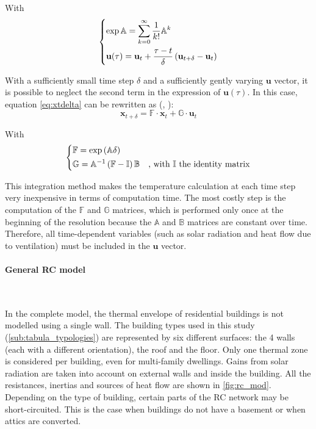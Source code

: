 \documentclass[11pt]{article}
\begin{document}
        \noindent
        With
        $$
        \begin{dcases}
          \exp \mathbb{A}= \sum_{k=0}^\infty \frac{1}{k!}\mathbb{A}^k\\
          \mathbf{u}(\tau)= \mathbf{u}_t + \frac{\tau-t}{\delta}\left(\mathbf{u}_{t+\delta}-\mathbf{u}_t\right)\\
        \end{dcases}
        $$

        With a sufficiently small time step $\delta$ and a sufficiently gently varying $\mathbf{u}$ vector, it is possible to neglect the second term in the expression of $\mathbf{u}(\tau)$. In this case, equation \eqref{eq:xtdelta} can be rewritten as (\cite{seem_transfer_1989}, \cite{madsen_estimation_1995}): 
        \begin{equation}\label{eq:xtfg}
            \mathbf{x}_{t+\delta} = \mathbb{F}\cdot\mathbf{x}_{t} + \mathbb{G}\cdot\mathbf{u}_{t}
        \end{equation}
        
        \noindent
        With
        $$
        \begin{dcases}
          \mathbb{F} = \exp\left(\mathbb{A}\delta\right)\\
          \mathbb{G}= \mathbb{A}^{-1}\left(\mathbb{F}-\mathbb{I}\right)\mathbb{B}&\text{, with $\mathbb{I}$ the identity matrix}\\
        \end{dcases}
        $$

        This integration method makes the temperature calculation at each time step very inexpensive in terms of computation time. The most costly step is the computation of the $\mathbb{F}$ and $\mathbb{G}$ matrices, which is performed only once at the beginning of the resolution because the $\mathbb{A}$ and $\mathbb{B}$ matrices are constant over time. Therefore, all time-dependent variables (such as solar radiation and heat flow due to ventilation) must be included in the $\mathbf{u}$ vector. 
        
        

        \paragraph{General RC model}\mbox{}\\ %
        \label{par:general_rc_model}
        
        In the complete model, the thermal envelope of residential buildings is not modelled using a single wall. The building types used in this study (\ref{sub:tabula_typologies}) are represented by six different surfaces: the 4 walls (each with a different orientation), the roof and the floor. Only one thermal zone is considered per building, even for multi-family dwellings. Gains from solar radiation are taken into account on external walls and inside the building. All the resistances, inertias and sources of heat flow are shown in \ref{fig:rc_mod}. Depending on the type of building, certain parts of the RC network may be short-circuited. This is the case when buildings do not have a basement or when attics are converted. \\
\end{document}
